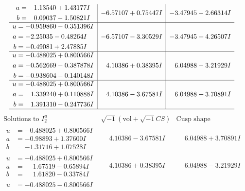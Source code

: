 \documentclass[1p]{elsarticle_modified}
\theoremstyle{definition}
\newcommand{\I}{\sqrt{-1}}
\begin{document}
$$\begin{array}{c|c|c}
\begin{aligned}
a &= \phantom{-}1.13540 + 1.43177 I \\
b &= \phantom{-}0.09037 - 1.50821 I\end{aligned}
 & -6.57107 + 0.75447 I & -3.47945 - 2.66314 I \\ \hline\begin{aligned}
u &= -0.959860 - 0.351396 I \\
a &= -2.25035 - 0.48264 I \\
b &= -0.49081 + 2.47885 I\end{aligned}
 & -6.57107 - 3.30529 I & -3.47945 + 4.26507 I \\ \hline\begin{aligned}
u &= -0.488025 + 0.800566 I \\
a &= -0.562669 - 0.387878 I \\
b &= -0.938604 - 0.140148 I\end{aligned}
 & \phantom{-}4.10386 + 0.38395 I & \phantom{-}6.04988 - 3.21929 I \\ \hline\begin{aligned}
u &= -0.488025 + 0.800566 I \\
a &= \phantom{-}1.339240 + 0.110888 I \\
b &= \phantom{-}1.391310 - 0.247736 I\end{aligned}
 & \phantom{-}4.10386 - 3.67581 I & \phantom{-}6.04988 + 3.70891 I\\
 \hline 
 \end{array}$$\newpage$$\begin{array}{c|c|c}  
\text{Solutions to }I^u_{2}& \I (\text{vol} + \sqrt{-1}CS) & \text{Cusp shape}\\
 \hline 
\begin{aligned}
u &= -0.488025 + 0.800566 I \\
a &= -0.98893 + 1.37600 I \\
b &= -1.31716 + 1.07528 I\end{aligned}
 & \phantom{-}4.10386 - 3.67581 I & \phantom{-}6.04988 + 3.70891 I \\ \hline\begin{aligned}
u &= -0.488025 + 0.800566 I \\
a &= \phantom{-}1.67519 - 0.65894 I \\
b &= \phantom{-}1.61820 - 0.33784 I\end{aligned}
 & \phantom{-}4.10386 + 0.38395 I & \phantom{-}6.04988 - 3.21929 I \\ \hline\begin{aligned}
u &= -0.488025 - 0.800566 I \\

\end{aligned}
\end{array}$$
\end{document}
